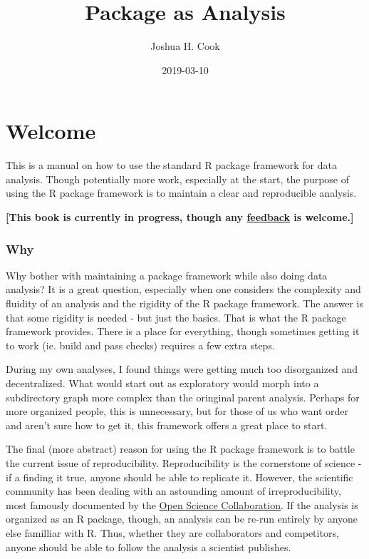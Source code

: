 \documentclass[]{book}
\title{Package as Analysis}
\author{Joshua H. Cook}
\date{2019-03-10}
\begin{document}
\maketitle

{
\setcounter{tocdepth}{1}
\tableofcontents
}
\chapter*{Welcome}\label{welcome}

This is a manual on how to use the standard R package framework for data
analysis. Though potentially more work, especially at the start, the
purpose of using the R package framework is to maintain a clear and
reproducible analysis.

\textbf{{[}This book is currently in progress, though any
\href{https://github.com/jhrcook/package-as-analysis/issues}{feedback}
is welcome.{]}}

\subsection*{Why}\label{why}

Why bother with maintaining a package framework while also doing data
analysis? It is a great question, especially when one considers the
complexity and fluidity of an analysis and the rigidity of the R package
framework. The answer is that some rigidity is needed - but just the
basics. That is what the R package framework provides. There is a place
for everything, though sometimes getting it to work (ie. build and pass
checks) requires a few extra steps.

During my own analyses, I found things were getting much too
disorganized and decentralized. What would start out as exploratory
would morph into a subdirectory graph more complex than the oringinal
parent analysis. Perhaps for more organized people, this is unnecessary,
but for those of us who want order and aren't sure how to get it, this
framework offers a great place to start.

The final (more abstract) reason for using the R package framework is to
battle the current issue of reproducibility. Reproducibility is the
cornerstone of science - if a finding it true, anyone should be able to
replicate it. However, the scientific community has been dealing with an
astounding amount of irreproducibility, most famously documented by the
\href{http://science.sciencemag.org/content/349/6251/aac4716}{Open
Science Collaboration}. If the analysis is organized as an R package,
though, an analysis can be re-run entirely by anyone else familliar with
R. Thus, whether they are collaborators and competitors, anyone should
be able to follow the analysis a scientist publishes.
\end{document}
